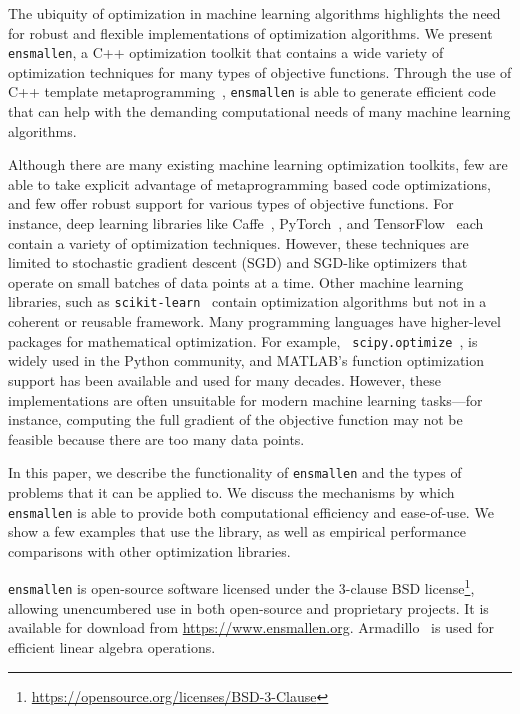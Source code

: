 \documentclass{article}
\begin{document}
The ubiquity of optimization in machine learning algorithms highlights the need
for robust and flexible implementations of optimization algorithms.
We present {\tt ensmallen}, a C++ optimization toolkit
that contains a wide variety of optimization techniques for many types of
objective functions.  Through the use of C++ template
metaprogramming~\cite{Alexandrescu2001},
{\tt ensmallen} is able to generate efficient code that can help with the
demanding computational needs of many machine learning algorithms.

Although there are many existing machine learning optimization toolkits, few
are able to take explicit advantage of metaprogramming based code optimizations,
and few offer robust support for various types of objective functions.
For instance, deep learning
libraries like Caffe~\cite{jia2014caffe},
PyTorch~\cite{paszke2017automatic},
and TensorFlow~\cite{abadi2016tensorflow}
each contain a variety of optimization techniques.  However, these techniques are
limited to stochastic gradient descent (SGD) and SGD-like optimizers that
operate on small batches of data points at a time.  Other machine learning
libraries, such as {\tt scikit-learn}~\cite{pedregosa2011scikit}
contain optimization algorithms but not in a coherent or reusable framework.
Many programming languages have higher-level packages for
mathematical optimization.  For example, {\tt
scipy.optimize}~\cite{jones2014scipy},
is widely used in the Python community, and MATLAB's function optimization
support has been available and used for many decades.
However, these
implementations are often unsuitable for modern machine learning tasks---for
instance, computing the full gradient of the objective function may not be
feasible because there are too many data points.

In this paper, we describe the functionality of {\tt ensmallen} and the types of
problems that it can be applied to.  We discuss the mechanisms by which {\tt ensmallen} is
able to provide both computational efficiency and ease-of-use.
We show a few examples that use the library, as well as empirical performance comparisons
with other optimization libraries.

{\tt ensmallen} is open-source software licensed under the 3-clause BSD
license\footnote{\url{https://opensource.org/licenses/BSD-3-Clause}},
allowing unencumbered use in both open-source and proprietary projects.
It is available for download from \url{https://www.ensmallen.org}.
Armadillo~\cite{sanderson2016armadillo} is used for efficient linear algebra operations.
\end{document}
